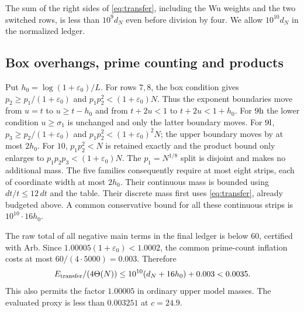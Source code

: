 \documentclass[11pt]{article}
\theoremstyle{definition}
\newcommand{\eps}{\varepsilon}
\newcommand{\Th}{\Theta(N)}
\begin{document}
The sum of the right sides of \eqref{eq:transfer}, including the Wu
weights and the two switched rows, is less than $10^9d_N$ even before
division by four.  We allow $10^{10}d_N$ in the normalized ledger.

\subsection{Box overhangs, prime counting and products}

Put $h_0=\log(1+\eps_0)/L$.  For rows $7,8$, the box condition gives
$p_2\ge p_1/(1+\eps_0)$ and $p_1p_2^2<(1+\eps_0)N$.
Thus the exponent boundaries move from $u=t$ to $u\ge t-h_0$ and
from $t+2u<1$ to $t+2u<1+h_0$.
For $9{\rm h}$ the lower condition $u\ge\sigma_1$ is unchanged and
only the latter boundary moves.  For $9{\rm l}$,
$p_3\ge p_2/(1+\eps_0)$ and
$p_1p_2^2<(1+\eps_0)^2N$; the upper boundary moves by at most $2h_0$.
For $10$, $p_1p_2^2<N$ is retained exactly and the product bound only
enlarges to $p_1p_2p_3<(1+\eps_0)N$.
The $p_1=N^{1/8}$ split is disjoint and makes no additional mass.
The five families consequently require at most eight strips, each of
coordinate width at most $2h_0$.  Their continuous mass is bounded using
$dt/t\le12\,dt$ and the table.  Their discrete mass first uses
\eqref{eq:transfer}, already budgeted above.  A common conservative
bound for all these continuous strips is $10^{10}\cdot16h_0$.

The raw total of all negative main terms in the final ledger is below
$60$, certified with Arb.  Since
$1.00005(1+\eps_0)<1.0002$, the common prime-count inflation costs at
most $60/(4\cdot5000)=0.003$.  Therefore
\begin{equation}\label{eq:transfer-cost}
 E_{\rm transfer}/(4\Th)
 \le10^{10}(d_N+16h_0)+0.003<0.0035.
\end{equation}
This also permits the factor $1.00005$ in ordinary upper model masses.
The evaluated proxy is less than $0.003251$ at $c=24.9$.
\end{document}
